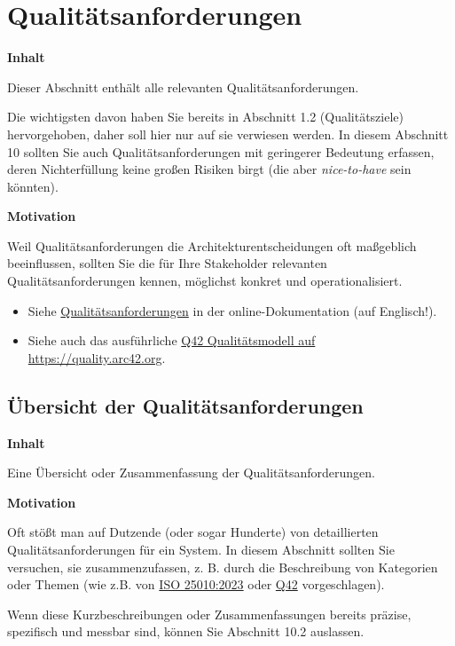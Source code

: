 \documentclass[
]{article}
\begin{document}
\section{Qualitätsanforderungen}\label{section-quality-scenarios}

\textbf{Inhalt}

Dieser Abschnitt enthält alle relevanten Qualitätsanforderungen.

Die wichtigsten davon haben Sie bereits in Abschnitt 1.2
(Qualitätsziele) hervorgehoben, daher soll hier nur auf sie verwiesen
werden. In diesem Abschnitt 10 sollten Sie auch Qualitätsanforderungen
mit geringerer Bedeutung erfassen, deren Nichterfüllung keine großen
Risiken birgt (die aber \emph{nice-to-have} sein könnten).

\textbf{Motivation}

Weil Qualitätsanforderungen die Architekturentscheidungen oft maßgeblich
beeinflussen, sollten Sie die für Ihre Stakeholder relevanten
Qualitätsanforderungen kennen, möglichst konkret und operationalisiert.

\begin{itemize}
\item
  Siehe
  \href{https://docs.arc42.org/section-10/}{Qualitätsanforderungen} in
  der online-Dokumentation (auf Englisch!).
\item
  Siehe auch das ausführliche \href{https://quality.arc42.org}{Q42
  Qualitätsmodell auf https://quality.arc42.org}.
\end{itemize}

\subsection{Übersicht der
Qualitätsanforderungen}\label{_uxfcbersicht_der_qualituxe4tsanforderungen}

\textbf{Inhalt}

Eine Übersicht oder Zusammenfassung der Qualitätsanforderungen.

\textbf{Motivation}

Oft stößt man auf Dutzende (oder sogar Hunderte) von detaillierten
Qualitätsanforderungen für ein System. In diesem Abschnitt sollten Sie
versuchen, sie zusammenzufassen, z. B. durch die Beschreibung von
Kategorien oder Themen (wie z.B. von
\href{https://www.iso.org/obp/ui/\#iso:std:iso-iec:25010:ed-2:v1:en}{ISO
25010:2023} oder \href{https://quality.arc42.org}{Q42} vorgeschlagen).

Wenn diese Kurzbeschreibungen oder Zusammenfassungen bereits präzise,
spezifisch und messbar sind, können Sie Abschnitt 10.2 auslassen.
\end{document}

